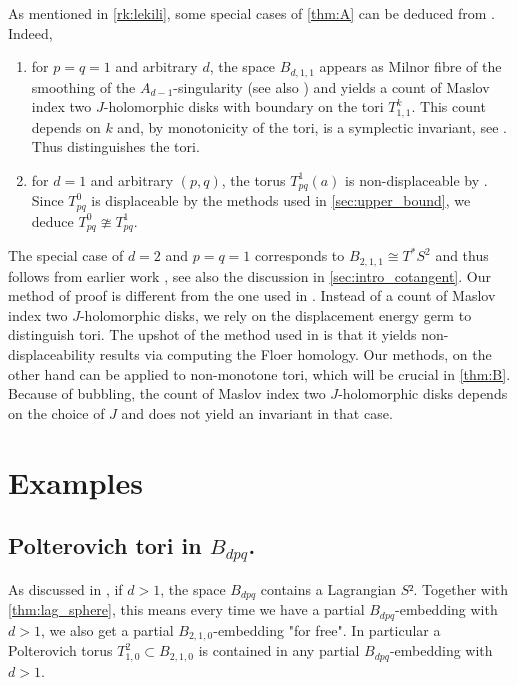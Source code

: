 \documentclass[12pt,a4paper,abstract=true,draft]{scrartcl}
\begin{document}
\begin{remark}
    \label{rk:lekili2}
    As mentioned in \cref{rk:lekili}, some special cases of \cref{thm:A} can be deduced from \cite{LekMay14}. Indeed, 
    \begin{enumerate}
        \item for $p = q = 1$ and arbitrary $d$, the space $B_{d,1,1}$ appears as Milnor fibre of the smoothing of the $A_{d-1}$-singularity (see also \cite[Section 7.3]{evans2021atfs}) and \cite[Lemma 2.19]{LekMay14} yields a count of Maslov index two $J$-holomorphic disks with boundary on the tori $T^k_{1,1}$. This count depends on $k$ and, by monotonicity of the tori, is a symplectic invariant, see \cite{EliPol97}. Thus \cite[Lemma 2.19]{LekMay14} distinguishes the tori.
        \item for $d = 1$ and arbitrary $(p,q)$, the torus $T^1_{pq}(a)$ is non-displaceable by \cite[Proposition 3.6]{LekMay14}. Since $T^0_{pq}$ is displaceable by the methods used in \cref{sec:upper_bound}, we deduce $T^0_{pq} \ncong T^1_{pq}$.
    \end{enumerate}
    The special case of $d=2$ and $p=q=1$ corresponds to $B_{2,1,1} \cong T^*S^2$ and thus follows from earlier work \cite{AlbFra08}, see also the discussion in \cref{sec:intro_cotangent}. Our method of proof is different from the one used in \cite{LekMay14}. Instead of a count of Maslov index two $J$-holomorphic disks, we rely on the displacement energy germ to distinguish tori. The upshot of the method used in \cite{LekMay14} is that it yields non-displaceability results via computing the Floer homology. Our methods, on the other hand can be applied to non-monotone tori, which will be crucial in \cref{thm:B}. Because of bubbling, the count of Maslov index two $J$-holomorphic disks depends on the choice of $J$ and does not yield an invariant in that case.
\end{remark}

\section{Examples}
\label{sec:examples}

\subsection{Polterovich tori in \texorpdfstring{$B_{dpq}$}{B_dpq}.}
As discussed in \cite[Remark 7.10]{evans2021atfs}, if $d>1$, the space $B_{dpq}$ contains a Lagrangian $S²$.
Together with \cref{thm:lag_sphere}, this means every time we have a partial $B_{dpq}$-embedding with $d>1$, we also get a partial $B_{2,1,0}$-embedding "for free".
In particular a Polterovich torus $T^2_{1,0} ⊂ B_{2,1,0}$ is contained in any partial $B_{dpq}$-embedding with $d>1$.
\end{document}
